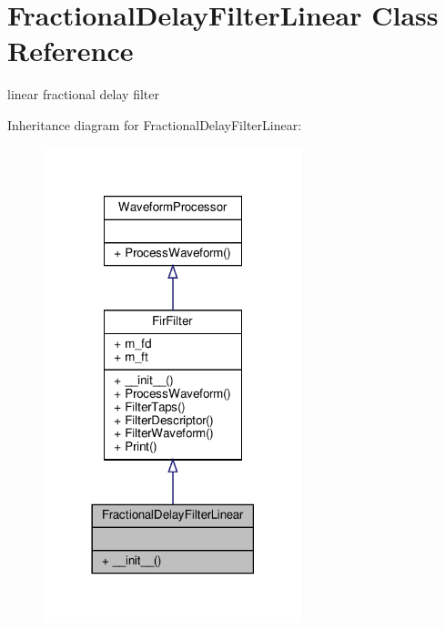 \hypertarget{classSignalIntegrity_1_1TimeDomain_1_1Filters_1_1InterpolatorLinear_1_1FractionalDelayFilterLinear}{}\section{Fractional\+Delay\+Filter\+Linear Class Reference}
\label{classSignalIntegrity_1_1TimeDomain_1_1Filters_1_1InterpolatorLinear_1_1FractionalDelayFilterLinear}


linear fractional delay filter  




Inheritance diagram for Fractional\+Delay\+Filter\+Linear\+:\nopagebreak
\begin{figure}[H]
\begin{center}
\leavevmode
\includegraphics[width=213pt]{classSignalIntegrity_1_1TimeDomain_1_1Filters_1_1InterpolatorLinear_1_1FractionalDelayFilterLinear__inherit__graph}
\end{center}
\end{figure}



